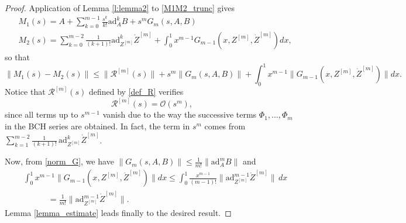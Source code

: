 \documentclass[10pt,a4paper]{amsart}
\newcommand{\ad}{\ensuremath{\mathrm{ad}}}
\begin{document}
\begin{proof}
Application of Lemma \ref{l:lemma2} to \eqref{M1M2_trunc} gives
\[
 \begin{aligned}
  & M_1(s) = A + \sum_{k=0}^{m-1} \frac{s^k}{k!} \ad_A^k B + s^m G_m(s,A,B) \\
  & M_2(s) =  \sum_{k=0}^{m-2} \frac{1}{(k+1)!} \ad_{Z^{[m]}}^k \dot{Z}^{[m]} + \int_0^1 x^{m-1} G_{m-1}(x,Z^{[m]},  \dot{Z}^{[m]}) dx,
 \end{aligned}
\]
so that
\[
 \|M_1(s) - M_2(s)\| \le \|  \mathcal{R}^{[m]}(s) \| + s^m \|G_m(s,A,B)\| +  \int_0^1 x^{m-1} \| G_{m-1}(x,Z^{[m]},  \dot{Z}^{[m]})\| dx.
\]
Notice that $\mathcal{R}^{[m]}(s)$ defined by \eqref{def_R} verifies 
\[
   \mathcal{R}^{[m]}(s) = \mathcal{O}(s^m),
\]
since all terms up to $s^{m-1}$ vanish due to the way the successive terms $\Phi_1, \ldots, \Phi_m$ in the BCH series are obtained.  In fact, 
the term in $s^m$ comes from
$\sum_{k=1}^{m-2} \frac{1}{(k+1)!} \, \ad_{Z^{[m]}}^k \dot{Z}^{[m]}$. 


Now, from \eqref{norm_G}, we have
  $\|G_m(s,A,B)\| \le  \frac{1}{m!} \|\ad_A^m B\|$
and
\begin{equation} \label{norm_G2}
\begin{aligned}
   & \int_0^1 x^{m-1} \| G_{m-1}(x,Z^{[m]},  \dot{Z}^{[m]})\| dx   \le  \int_0^1 \frac{x^{m-1}}{(m-1)!} 
    \| \ad_{Z^{[m]}}^{m-1} \dot{Z}^{[m]} \| \, dx   \\
  & \qquad\quad = \frac{1}{m!} \| \ad_{Z^{[m]}}^{m-1} \dot{Z}^{[m]} \|.
\end{aligned}    
\end{equation}  
Lemma \ref{lemma_estimate} leads finally to the desired result. 
\end{proof}   
\end{document}
